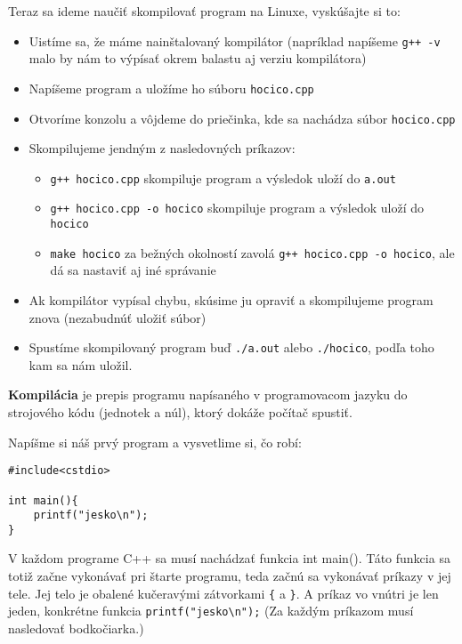 Teraz sa ideme naučiť skompilovať program na Linuxe, vyskúšajte si to:
\begin{itemize}
    \item Uistíme sa, že máme nainštalovaný kompilátor (napríklad napíšeme \verb!g++ -v! malo by nám to 
    výpísať okrem balastu aj verziu kompilátora)
    \item Napíšeme program a uložíme ho súboru \verb!hocico.cpp!
    \item Otvoríme konzolu a vôjdeme do priečinka, kde sa nachádza súbor \verb!hocico.cpp!
    \item Skompilujeme jendným z nasledovných príkazov:
    \begin{itemize}
        \item \verb!g++ hocico.cpp! skompiluje program a výsledok uloží do \verb!a.out!
        \item \verb!g++ hocico.cpp -o hocico! skompiluje program a výsledok uloží do \verb!hocico!
        \item \verb!make hocico! za bežných okolností zavolá \verb!g++ hocico.cpp -o hocico!, ale dá
        sa nastaviť aj iné správanie
    \end{itemize}
    \item Ak kompilátor vypísal chybu, skúsime ju opraviť a skompilujeme
    program znova (nezabudnúť uložiť súbor) 
    \item Spustíme skompilovaný program
    buď \verb!./a.out! alebo \verb!./hocico!, podľa toho kam sa nám uložil.
    
\end{itemize}


\textbf{Kompilácia} je prepis programu napísaného v programovacom jazyku do
strojového kódu (jednotek a núl), ktorý dokáže počítač spustiť.


Napíšme si náš prvý program a vysvetlime si, čo robí:
\begin{lstlisting}
#include<cstdio>

int main(){
    printf("jesko\n");
}
\end{lstlisting}

V každom programe C++ sa musí nachádzať funkcia int main(). Táto funkcia sa
totiž začne vykonávať pri štarte programu, teda začnú sa vykonávať príkazy v
jej tele.  Jej telo je obalené kučeravými zátvorkami \verb'{' a \verb'}'. A
príkaz vo vnútri je len jeden, konkrétne funkcia \verb!printf("jesko\n");! (Za
každým príkazom musí nasledovať bodkočiarka.)

